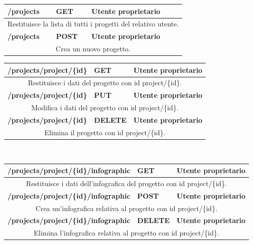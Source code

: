 \begin{table}[h]
	\begin{tabular}{|p{}|p{}|p{}|}
		\toprule
		\textbf{/projects} & \textbf{GET} & \textbf{Utente proprietario} \\ \midrule
		\multicolumn{3}{|c|}{Restituisce la lista di tutti i progetti del relativo utente.} \\
		\bottomrule
		\textbf{/projects} & \textbf{POST} & \textbf{Utente proprietario} \\ \midrule
		\multicolumn{3}{|c|}{Crea un nuovo progetto.} \\
		\bottomrule
	\end{tabular}
\end{table}
\newpage

\begin{table}[H]
	\begin{tabular}{|p{}|p{}|p{}|}
		\toprule
		\textbf{/projects/project/\{id\}} & \textbf{GET} & \textbf{Utente proprietario} \\ \midrule
		\multicolumn{3}{|c|}{Restituisce i dati del progetto con id project/\{id\}.} \\ \midrule
		\textbf{/projects/project/\{id\}} & \textbf{PUT} & \textbf{Utente proprietario} \\ \midrule
		\multicolumn{3}{|c|}{Modifica i dati del progetto con id project/\{id\}.} \\ \midrule
		\textbf{/projects/project/\{id\}} & \textbf{DELETE} & \textbf{Utente proprietario} \\ \midrule
		\multicolumn{3}{|c|}{Elimina il progetto con id project/\{id\}.} \\
		\bottomrule
	\end{tabular}
	\\ \par\bigskip
	
	\begin{tabular}{|p{}|p{}|p{}|}
		\toprule
		\textbf{/projects/project/\{id\}/infographic} & \textbf{GET} & \textbf{Utente proprietario} \\ \midrule
		\multicolumn{3}{|c|}{Restituisce i dati dell'infografica del progetto con id project/\{id\}.} \\
		\bottomrule
		\textbf{/projects/project/\{id\}/infographic} & \textbf{POST} & \textbf{Utente proprietario} \\ \midrule
		\multicolumn{3}{|c|}{Crea un'infografica relativa al progetto con id project/\{id\}.} \\
		\bottomrule
		\textbf{/projects/project/\{id\}/infographic} & \textbf{DELETE} & \textbf{Utente proprietario} \\ \midrule
		\multicolumn{3}{|c|}{Elimina l'infografica relativa al progetto con id project/\{id\}.} \\
		\bottomrule
	\end{tabular}\\
	\par\bigskip
	

\end{table}
